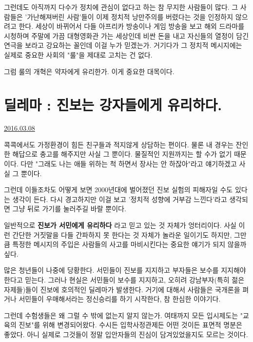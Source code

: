 그런데도 아직까지 다수가 정치에 관심이 없다고 하는 참 무지한 사람들이 많다.
그 사람들은 '가난해져버린 사람'들이 이제 정치적 낭만주의를 버렸다는 것을 인정하지 않으려고 한다.
세상이 바뀌어서 다들 아프리카 방송이나 게임 방송을 보고 해외 드라마를 시청하며 주말에 가끔 대형영화관 가는 세상인데
비싼 돈을 내고 자신들의 열정이 담긴 연극을 보라고 강요하는 꼴인데 이걸 누가 믿겠는가.
거기다가 그 정치적 메시지에는 실제로 중요한 사회의 "룰"을 제대로 고치는 건 없다.
\vspace{5mm}

그럼 룰의 개혁은 약자에게 유리한가.
이게 중요한 대목이다.
\vspace{5mm}






\section{딜레마 : 진보는 강자들에게 유리하다.}
\href{https://www.kockoc.com/Apoc/668589}{2016.03.08}

\vspace{5mm}

콕콕에서도 가정환경이 힘든 친구들과 적지않게 상담하는 편이다.
물론 내 경우는 잔인한 해답으로 충고를 해주지만 사실 그 뿐이다. 물질적인 지원까지는 할 수가 없기 때문이다.
다만 "그래도 나는 애들 위하는 척 하면서 장사는 안 하잖아"라고 얘기하겠고 사실 그 뿐이다.
\vspace{5mm}

그런데 이들조차도 어떻게 보면 2000년대에 벌어졌던 진보 실험의 피해자일 수도 있다는 생각이 든다.
다시 경고하지만 이걸 보고 '정치적 성향에 거부감 느낀다'라고 생각되면 그냥 뒤로 가기를 눌러주길 바랄 뿐이다.
\vspace{5mm}

일반적으로 \textbf{진보가 서민에게 유리하다} 라고 믿고 있는 것 자체가 엉터리이다.
사실 이런 간단한 거짓말을 다들 간파하지 못 한다는 것 자체가 놀라운 일이기도 하지만,
그만큼 특정한 메시지의 주입은 사람들의 사고를 마비시킨다는 중요한 얘기가 되지 않을까 싶다.
\vspace{5mm}

많은 청년들이 나중에 당황한다. 서민들이 진보를 지지하고 부자들은 보수를 지지해야 한다고 믿는다.
그러나 현실은 서민들이 보수를 지지하고, 오히려 강남부자(특히 젊은 자제들)들이 진보에 호의적인 딜레마가 발생한다.
거기에 대해서 사람들은 국개론을 펴거나 서민들이 우매해서라는 정신승리를 하기 시작한다, 참 한심한 이야기다.
\vspace{5mm}

그런데 수험생들은 왜 그럴 수 밖에 없는지 알지 않는가.
여태까지 모든 입시제도는 "교육의 진보"를 위해 변경되어왔다. 수시든 입학사정관제든 어떤 것이든 표면적 명분은 좋았다.
아니 실제로 그것들이 정말 입안자들의 진심이 담겨있었을지도 모르는 것이다.
\vspace{5mm}

